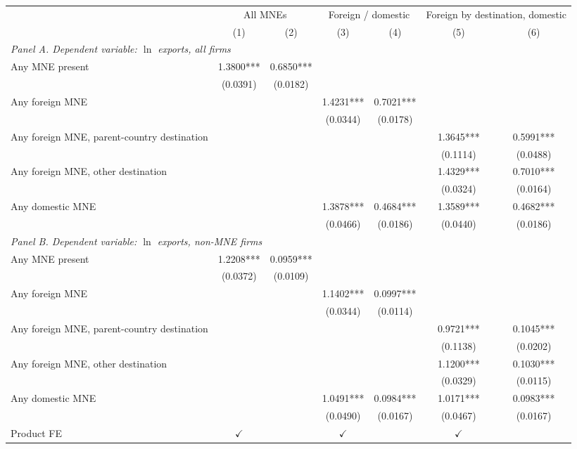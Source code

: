 \begin{tabular}{lcccccc} \hline
 & \multicolumn{2}{c}{All MNEs} & \multicolumn{2}{c}{Foreign / domestic} & \multicolumn{2}{c}{Foreign by destination, domestic} \\
 & (1) & (2) & (3) & (4) & (5) & (6) \\ \hline
\multicolumn{7}{l}{\textit{Panel A. Dependent variable: $\ln$ exports, all firms}} \\
Any MNE present & 1.3800*** & 0.6850*** &  &  &  &  \\
 & (0.0391) & (0.0182) &  &  &  &  \\
Any foreign MNE &  &  & 1.4231*** & 0.7021*** &  &  \\
 &  &  & (0.0344) & (0.0178) &  &  \\
Any foreign MNE, parent-country destination &  &  &  &  & 1.3645*** & 0.5991*** \\
 &  &  &  &  & (0.1114) & (0.0488) \\
Any foreign MNE, other destination &  &  &  &  & 1.4329*** & 0.7010*** \\
 &  &  &  &  & (0.0324) & (0.0164) \\
Any domestic MNE &  &  & 1.3878*** & 0.4684*** & 1.3589*** & 0.4682*** \\
 &  &  & (0.0466) & (0.0186) & (0.0440) & (0.0186) \\
\midrule
\multicolumn{7}{l}{\textit{Panel B. Dependent variable: $\ln$ exports, non-MNE firms}} \\
Any MNE present & 1.2208*** & 0.0959*** &  &  &  &  \\
 & (0.0372) & (0.0109) &  &  &  &  \\
Any foreign MNE &  &  & 1.1402*** & 0.0997*** &  &  \\
 &  &  & (0.0344) & (0.0114) &  &  \\
Any foreign MNE, parent-country destination &  &  &  &  & 0.9721*** & 0.1045*** \\
 &  &  &  &  & (0.1138) & (0.0202) \\
Any foreign MNE, other destination &  &  &  &  & 1.1200*** & 0.1030*** \\
 &  &  &  &  & (0.0329) & (0.0115) \\
Any domestic MNE &  &  & 1.0491*** & 0.0984*** & 1.0171*** & 0.0983*** \\
 &  &  & (0.0490) & (0.0167) & (0.0467) & (0.0167) \\
\hline
Product FE & $\checkmark$ &  & $\checkmark$ &  & $\checkmark$ &  \\

\end{tabular}
